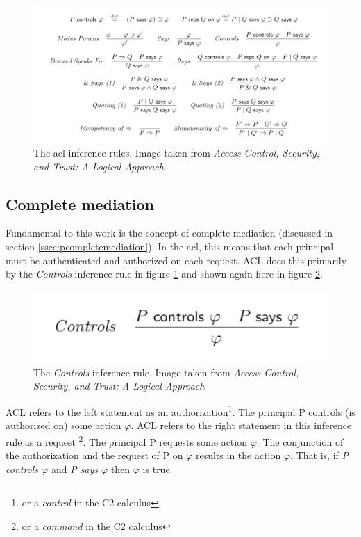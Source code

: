 \documentclass[../../main/main.tex]{subfiles}
\begin{document}
\begin{figure}[h]
\centering
\includegraphics[width=\textwidth]{../figures/inferencerules}
\caption{\label{inferencerules}The \gls{acl} inference rules. Image taken from \textit{Access Control, Security, and Trust: A Logical Approach}\cite{ChinOlder}}
\end{figure}

\subsection{Complete mediation}\label{ssec:aclcompletemediation}
Fundamental to this work is the concept of complete mediation (discussed in section \ref{ssec:pcompletemediation}).  In the \gls{acl}, this means that each principal must be authenticated and authorized on each request.   ACL does this primarily by the \textit{Controls} inference rule in figure \ref{inferencerules} and shown again here in figure \ref{ControlsInferenceRule}. 

\begin{figure}[h]
\centering
\includegraphics{../figures/ControlsInferenceRule}
\caption{\label{ControlsInferenceRule}The \textit{Controls} inference rule. Image taken from \textit{Access Control, Security, and Trust: A Logical Approach}\cite{ChinOlder}}
\end{figure}

ACL refers to the left statement as an authorization\footnote{or a \textit{control} in the C2 calculus}.  The principal P controls (is authorized on) some action $\varphi$. ACL refers to the right statement in this inference rule as a request \footnote{or a \textit{command} in the C2 calculus}.  The principal P requests some action $\varphi$. The conjunction of the authorization and the request of P on $\varphi$ results in the action $\varphi$.  That is, if \textit{P controls $\varphi$} and\textit{ P says $\varphi$} then $\varphi$  is true.  
\end{document}
